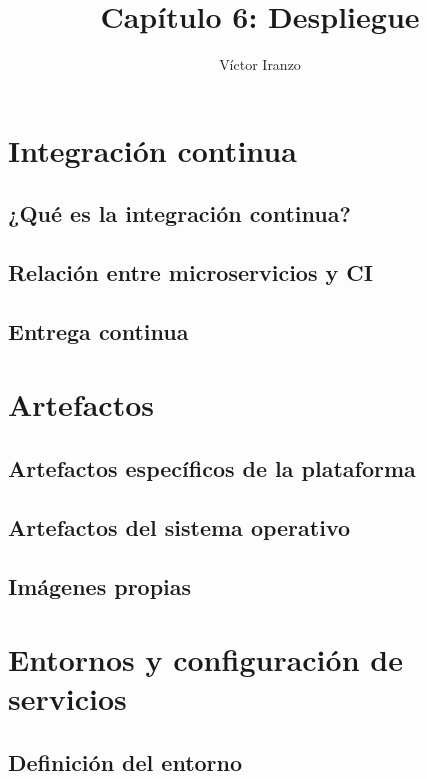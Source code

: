 \documentclass[11pt,a4paper]{article}
\author{Víctor Iranzo}
\title{Capítulo 6: Despliegue}
\begin{document}
\maketitle

\section{Integración continua}

\subsection{¿Qué es la integración continua?}

\subsection{Relación entre microservicios y CI}

\subsection{Entrega continua}

\section{Artefactos}

\subsection{Artefactos específicos de la plataforma}

\subsection{Artefactos del sistema operativo}

\subsection{Imágenes propias}

\section{Entornos y configuración de servicios}

\subsection{Definición del entorno}
\end{document}
